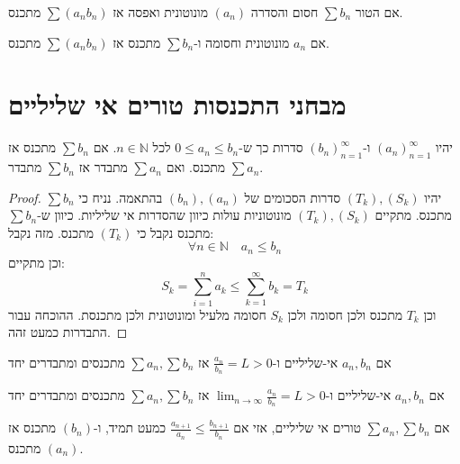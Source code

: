 \documentclass{tstextbook}
\begin{document}
\begin{proposition}
אם הטור \(\sum b_n\) חסום והסדרה \((a_n)\) מונוטונית ואפסה אז \(\sum (a_n b_n)\) מתכנס.

\end{proposition}
\begin{proposition}
אם \(a_n\) מונוטונית וחסומה ו-\(\sum b_n\) מתכנס אז \(\sum (a_n b_n)\) מתכנס.

\end{proposition}
\section{מבחני התכנסות טורים אי שליליים}

\begin{theorem}
יהיו \((a_n)_{n=1}^\infty\) ו-\((b_n)_{n=1}^\infty\) סדרות כך ש-\(0\leq a_{n}\leq b_{n}\) לכל \(n \in \mathbb{N}\). אם \(\sum b_{n}\) מתכנס אז \(\sum a_{n}\) מתכנס. ואם \(\sum a_{n}\) מתבדר אז \(\sum b_{n}\) מתבדר.

\end{theorem}
\begin{proof}
יהיו \((T_{k}),(S_{k})\) סדרות הסכומים של \((b_{n}),(a_{n})\) בהתאמה. נניח כי \(\sum b_{n}\) מתכנס. מתקיים \((T_{k}),(S_{k})\) מונוטוניות עולות כיוון שהסדרות אי שליליות. כיוון ש-\(\sum b_{n}\) מתכנס נקבל כי \((T_{k})\) מתכנס. מזה נקבל:
$$\forall n \in \mathbb{N} \quad a_{n}\leq b_{n}$$
וכן מתקיים:
$$S_{k}=\sum_{i=1}^{n} a_{k}\leq \sum_{k=1}^{\infty}b_{k}=T_{k}$$
וכן \(T_{k}\) מתכנס ולכן חסומה ולכן \(S_{k}\) חסומה מלעיל ומונוטונית ולכן מתכנסת. ההוכחה עבור התבדרות כמעט זהה.

\end{proof}
\begin{proposition}
אם \(a_n, b_n\) אי-שליליים ו-\(\frac{a_n}{b_n} = L >0\) אז \(\sum a_n , \sum b_n\) מתכנסים ומתבדרים יחד

\end{proposition}
\begin{proposition}
אם \(a_n, b_n\) אי-שליליים ו-\(\lim_{n\rightarrow \infty} \frac{a_n}{b_n} = L >0\) אז \(\sum a_n , \sum b_n\) מתכנסים ומתבדרים יחד

\end{proposition}
\begin{proposition}
אם \(\sum a_{n},\sum b_{n}\) טורים אי שליליים, אזי אם \(\frac{a_{n+1}}{a_{n}}\leq \frac{b_{n+1}}{b_{n}}\) כמעט תמיד, ו-\((b_{n})\) מתכנס אז \((a_{n})\) מתכנס.

\end{proposition}
\end{document}
